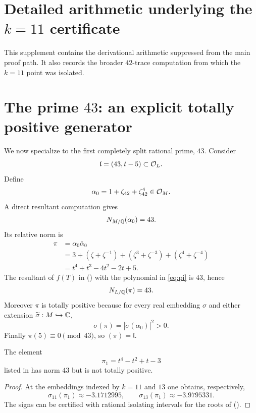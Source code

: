 \section{Detailed arithmetic underlying the $k=11$ certificate}\label{app:arithdetail}
This supplement contains the derivational arithmetic suppressed from the main proof path.  It also records the broader $42$-trace computation from which the $k=11$ point was isolated.

\section{The prime $43$: an explicit totally positive generator}\label{app:prime43}
We now specialize to the first completely split rational prime, $43$. Consider
\[
 \mathfrak l=(43,t-5)\subset\mathcal O_L.
\]
Define
\begin{equation}\label{eq:alpha0}
 \alpha_0=1+\zeta_{42}+\zeta_{42}^4\in\mathcal O_M.
\end{equation}
A direct resultant computation gives
\begin{equation}\label{eq:absnormalpha}
 N_{M/\mathbb Q}(\alpha_0)=43.
\end{equation}
Its relative norm is
\begin{align}
 \pi&=\alpha_0\bar\alpha_0\\
 &=3+(\zeta+\zeta^{-1})+(\zeta^3+\zeta^{-3})+(\zeta^4+\zeta^{-4})\\
 &=t^4+t^3-4t^2-2t+5.\label{eq:pi}
\end{align}
The resultant of $f(T)$ in () with the polynomial in \eqref{eq:pi} is $43$, hence
\[
 N_{L/\mathbb Q}(\pi)=43.
\]
Moreover $\pi$ is totally positive because for every real embedding $\sigma$ and either extension $\widetilde\sigma:M\hookrightarrow\mathbb C$,
\[
 \sigma(\pi)=|\widetilde\sigma(\alpha_0)|^2>0.
\]
Finally $\pi(5)\equiv0\pmod{43}$, so $(\pi)=\mathfrak l$.

\begin{proposition}\label{prop:pi1}
The element
\[
 \pi_1=t^4-t^2+t-3
\]
listed in \cite[Sec.~5.3]{Mostaed2026} has norm $43$ but is not totally positive.
\end{proposition}
\begin{proof}
At the embeddings indexed by $k=11$ and $13$ one obtains, respectively,
\[
 \sigma_{11}(\pi_1)\approx-3.1712995,\qquad
 \sigma_{13}(\pi_1)\approx-3.9795331.
\]
The signs can be certified with rational isolating intervals for the roots of ().
\end{proof}

